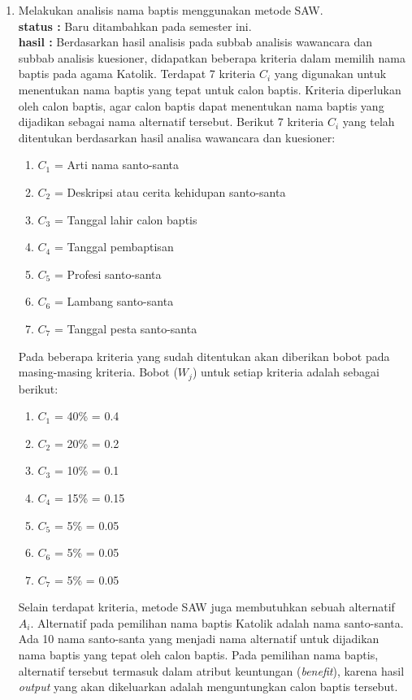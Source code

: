 \documentclass[a4paper,twoside]{article}
\begin{document}
\begin{enumerate}
\item Melakukan analisis nama baptis menggunakan metode SAW.\\
		{\bf status :} Baru ditambahkan pada semester ini.\\
		{\bf hasil :} Berdasarkan hasil analisis pada subbab analisis wawancara dan subbab analisis kuesioner, didapatkan beberapa kriteria dalam memilih nama baptis pada agama Katolik. Terdapat 7 kriteria $C_{i}$ yang digunakan untuk menentukan nama baptis yang tepat untuk calon baptis. Kriteria diperlukan oleh calon baptis, agar calon baptis dapat menentukan nama baptis yang dijadikan sebagai nama alternatif tersebut. Berikut 7 kriteria $C_{i}$ yang telah ditentukan berdasarkan hasil analisa wawancara dan kuesioner:
\begin{enumerate}
	\item $C_{1}$ = Arti nama santo-santa
	\item $C_{2}$ = Deskripsi atau cerita kehidupan santo-santa
	\item $C_{3}$ = Tanggal lahir calon baptis
	\item $C_{4}$ = Tanggal pembaptisan
	\item $C_{5}$ = Profesi santo-santa
	\item $C_{6}$ = Lambang santo-santa
	\item $C_{7}$ = Tanggal pesta santo-santa
\end{enumerate}
	
		Pada beberapa kriteria yang sudah ditentukan akan diberikan bobot pada masing-masing kriteria. Bobot ($W_{j}$) untuk setiap kriteria adalah sebagai berikut:
		
\begin{enumerate}
	\item $C_{1}$ = 40\% = 0.4
	\item $C_{2}$ = 20\% = 0.2
	\item $C_{3}$ = 10\% = 0.1
	\item $C_{4}$ = 15\% = 0.15
	\item $C_{5}$ = 5\% = 0.05
	\item $C_{6}$ = 5\% = 0.05
	\item $C_{7}$ = 5\% = 0.05
\end{enumerate}

Selain terdapat kriteria, metode SAW juga membutuhkan sebuah alternatif $A_{i}$. Alternatif pada pemilihan nama baptis Katolik adalah nama santo-santa. Ada 10 nama santo-santa yang menjadi nama alternatif untuk dijadikan nama baptis yang tepat oleh calon baptis. Pada pemilihan nama baptis, alternatif tersebut termasuk dalam atribut keuntungan (\textit{benefit}), karena hasil \textit{output} yang akan dikeluarkan adalah menguntungkan calon baptis tersebut.


\end{enumerate}
\end{document}
